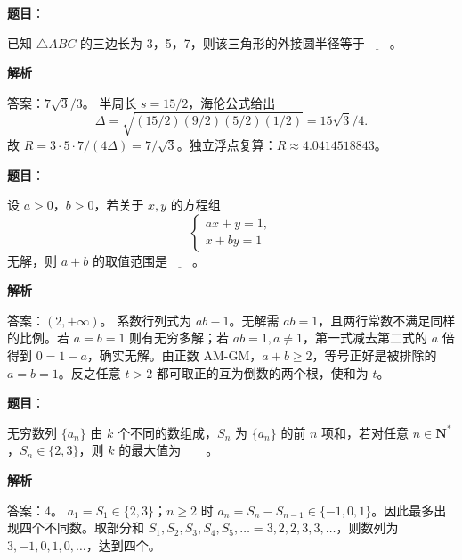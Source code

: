 \begin{answer}

\textbf{题目}：

已知 \(\triangle ABC\) 的三边长为 3，5，7，则该三角形的外接圆半径等于\(\underline{\qquad}\)。

\textbf{解析}

答案：\(7\sqrt3/3\)。
半周长 \(s=15/2\)，海伦公式给出
\nopagebreak[4]
\[
\Delta=\sqrt{(15/2)(9/2)(5/2)(1/2)}=15\sqrt3/4.
\]
故 \(R=3\cdot5\cdot7/(4\Delta)=7/\sqrt3\)。独立浮点复算：\(R\approx4.0414518843\)。


\end{answer}
\begin{answer}

\textbf{题目}：

设 \(a>0\)，\(b>0\)，若关于 \(x,y\) 的方程组
\nopagebreak[4]
\[
\begin{cases}
ax+y=1,\\
x+by=1
\end{cases}
\]
无解，则 \(a+b\) 的取值范围是\(\underline{\qquad}\)。

\textbf{解析}

答案：\((2,+\infty)\)。
系数行列式为 \(ab-1\)。无解需 \(ab=1\)，且两行常数不满足同样的比例。若 \(a=b=1\) 则有无穷多解；若 \(ab=1,a\ne1\)，第一式减去第二式的 \(a\) 倍得到 \(0=1-a\)，确实无解。由正数 AM-GM，\(a+b\ge2\)，等号正好是被排除的 \(a=b=1\)。反之任意 \(t>2\) 都可取正的互为倒数的两个根，使和为 \(t\)。


\end{answer}
\begin{answer}

\textbf{题目}：

无穷数列 \(\{a_n\}\) 由 \(k\) 个不同的数组成，\(S_n\) 为 \(\{a_n\}\) 的前 \(n\) 项和，若对任意 \(n\in\mathbf{N}^*\)，\(S_n\in\{2,3\}\)，则 \(k\) 的最大值为\(\underline{\qquad}\)。

\textbf{解析}

答案：\(4\)。
\(a_1=S_1\in\{2,3\}\)；\(n\ge2\) 时 \(a_n=S_n-S_{n-1}\in\{-1,0,1\}\)。因此最多出现四个不同数。取部分和 \(S_1,S_2,S_3,S_4,S_5,\ldots=3,2,2,3,3,\ldots\)，则数列为 \(3,-1,0,1,0,\ldots\)，达到四个。


\end{answer}
